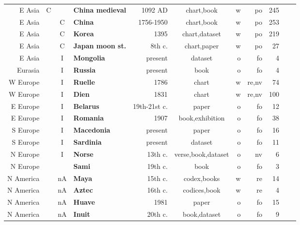 \documentclass[10pt]{article}
\begin{document}
\begin{table}[htbp]
{{\begin{tabular}{rcclrcrrrrr}
E Asia		& C	& 	& \textbf{China medieval}	& 1092 AD	& chart,book	& w	& po	& 245	& \cite{pan1989history,Stellarium} \\
E Asia		& 	& C	& \textbf{China}		& 1756-1950		& chart,book	& w	& po	& 253	& \cite{pan1989history,Stellarium} \\
E Asia		& 	& C	& \textbf{Korea}		& 1395			& chart,dataset	& w	& po	& 219	& \cite{Stellarium} \\
E Asia		& 	& C	& \textbf{Japan moon st.} & 8th c. 	& chart,paper	& w	& po	& 27	& \cite{renshaw2000cultural,Stellarium} \\
E Asia		& 	& I	& \textbf{Mongolia}	& present		& dataset		& o	& fo	& 4		& \cite{Stellarium} \\
Eurasia		& 	& I	& \textbf{Russia}		& present		& book			& o	& fo	& 4		& \cite{svjatskij2007astronomija} \\
\hline
%
W Europe	& 	& I	& \textbf{Ruelle}		& 1786			& chart			& w	& re,nv	& 74	& \cite{Ruelle} \\
W Europe	& 	& I	& \textbf{Dien}			& 1831			& chart			& w	& re,nv	& 100	& \cite{Dien} \\
E Europe	& 	& I	& \textbf{Belarus}	& 19th-21st c.	& paper			& o	& fo	& 12	& \cite{avilin2008astronyms,Stellarium} \\
E Europe	& 	& I	& \textbf{Romania}	& 1907			& book,exhibition& o& fo	& 38	& \cite{otescu1907,crtro,Stellarium} \\
S Europe	& 	& I	& \textbf{Macedonia}& present		& paper			& o	& fo	& 16	& \cite{cenev2008macedonian,Stellarium} \\
S Europe	& 	& I	& \textbf{Sardinia}	& present		& dataset		& o	& fo	& 11	& \cite{Stellarium} \\
N Europe	& 	& I	& \textbf{Norse}		& 13th c.		& verse,book,dataset& o	& nv& 6		& \cite{kaalund1908alfraedhi,Stellarium} \\
N Europe	& 	& 	& \textbf{Sami}			& 19th c.		& book			& o	& fo	& 3		& \cite{Lundmark1982bmn,Stellarium} \\
\hline
%
N America	& 	& nA& \textbf{Maya}			& 15th c.		& codex,books	& w	& re	& 14	& \cite{freidel1993maya,spotak2015maya,Stellarium} \\
N America	& 	& nA& \textbf{Aztec}		& 16th c.		& codices,book	& w	& re	& 4		& \cite{PrimerosMemoriales,FlorentineCodex,aveni1980skywatchers,Stellarium} \\
N America	& 	& nA& \textbf{Huave}		& 1981			& paper			& o	& fo	& 15	& \cite{lupo1981conoscenze} \\
N America	& 	& nA& \textbf{Inuit}		& 20th c.		& book,dataset	& o	& fo& 9	& \cite{macdonald1998arctic,Stellarium} \\

\end{tabular}}}
\end{table}
\end{document}
